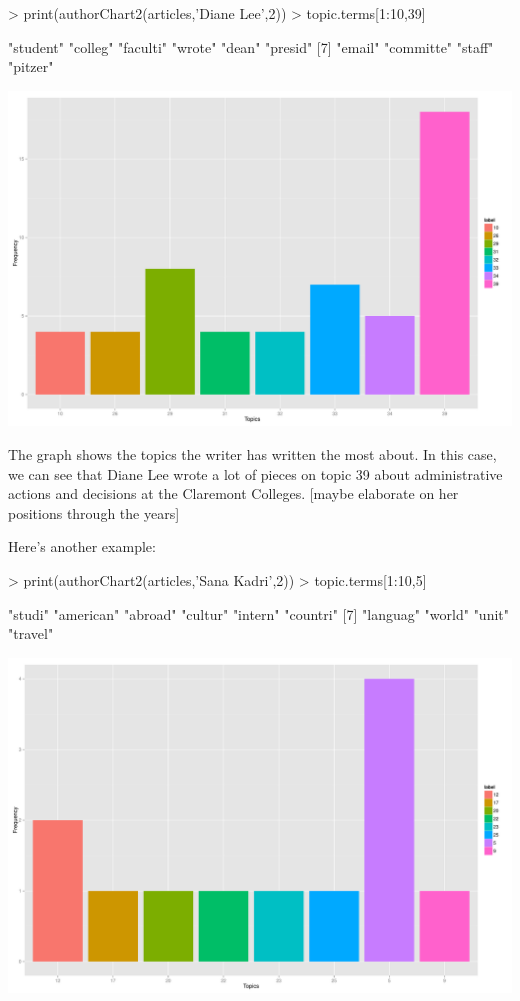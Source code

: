 \documentclass[a4paper]{article}
\begin{document}
\begin{Schunk}
\begin{Sinput}
> print(authorChart2(articles,'Diane Lee',2))
> topic.terms[1:10,39]
\end{Sinput}
\begin{Soutput}
 [1] "student"  "colleg"   "faculti"  "wrote"    "dean"     "presid"  
 [7] "email"    "committe" "staff"    "pitzer"  
\end{Soutput}
\end{Schunk}
\includegraphics{FinalProject-010}

The graph shows the topics the writer has written the most about. In this case, we can see that Diane Lee wrote a lot of pieces on topic 39 about administrative actions and decisions at the Claremont Colleges.
[maybe elaborate on her positions through the years]

Here's another example:

\begin{Schunk}
\begin{Sinput}
> print(authorChart2(articles,'Sana Kadri',2))
> topic.terms[1:10,5]
\end{Sinput}
\begin{Soutput}
 [1] "studi"    "american" "abroad"   "cultur"   "intern"   "countri" 
 [7] "languag"  "world"    "unit"     "travel"  
\end{Soutput}
\end{Schunk}
\includegraphics{FinalProject-011}
\end{document}
